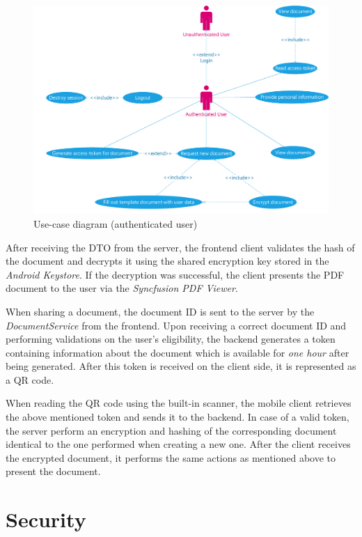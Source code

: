 \begin{figure}[H]
	\centering
	\includegraphics[scale=0.52]{use-case-diagram}
	\caption{Use-case diagram (authenticated user)}
\end{figure}

After receiving the DTO from the server, the frontend client validates the hash of the document and decrypts it using the shared encryption key stored in the \emph{Android Keystore}.
If the decryption was successful, the client presents the PDF document to the user via the \emph{Syncfusion PDF Viewer}. 

When sharing a document, the document ID is sent to the server by the \emph{DocumentService} from the frontend.
Upon receiving a correct document ID and performing validations on the user's eligibility, the backend generates a token containing information about the
document which is available for \emph{one hour} after being generated.
After this token is received on the client side, it is represented as a QR code.

When reading the QR code using the built-in scanner, the mobile client retrieves the above mentioned token and sends it to the backend.
In case of a valid token, the server perform an encryption and hashing of the corresponding document identical to the one performed when creating a
new one.
After the client receives the encrypted document, it performs the same actions as mentioned above to present the document.

\section{Security}

